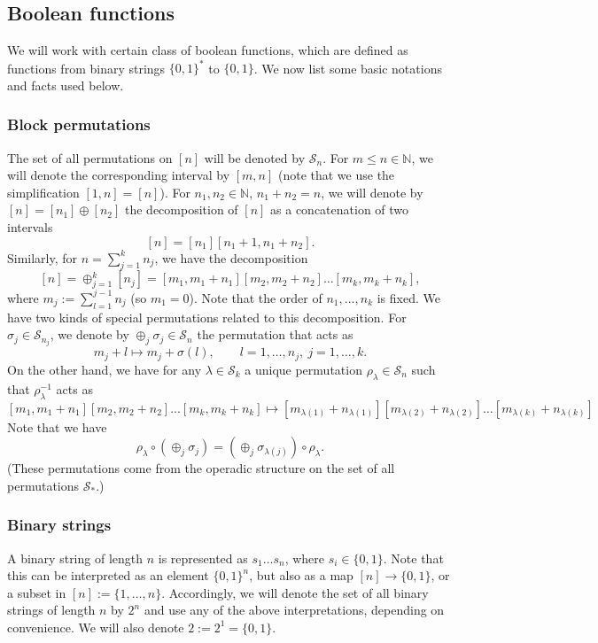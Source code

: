 \documentclass[12pt]{article}
\theoremstyle{definition}
\theoremstyle{remark}
\def\permut{\mathscr{S}}
\begin{document}
\subsection{Boolean functions}


We will work with certain class of boolean functions, which are defined as  functions from binary
strings $\{0,1\}^*$ to $\{0,1\}$. We now list some basic notations and facts used below.

\subsubsection{Block permutations}
\label{sec:permut}

The set of all permutations on $[n]$ will be denoted by $\permut_n$.
For $m\le n\in \mathbb N$, we will denote the corresponding interval by $[m,n]$ (note that
we use the simplification  $[1,n]=[n]$). For $n_1,n_2\in \mathbb N$, $n_1+n_2=n$, 
we will denote by $[n]=[n_1]\oplus [n_2]$ the decomposition of $[n]$ as a concatenation of two 
intervals
\[
[n]=[n_1][n_1+1,n_1+n_2].
\]
Similarly, for $n=\sum_{j=1}^kn_j$, we have the decomposition
\[
[n]=\oplus_{j=1}^k[n_j]=[m_1,m_1+n_1][m_2,m_2+n_2]\dots[m_k,m_k+n_k],
\]
where $m_j:=\sum_{l=1}^{j-1} n_j$ (so $m_1=0$). Note that the order of $n_1,\dots, n_k$ is
fixed. We have two kinds of special permutations related to this decomposition. For
$\sigma_j\in \permut_{n_j}$, we denote by $\oplus_j \sigma_j\in \permut_n$ the permutation that acts as
\[
m_j+l\mapsto m_j+\sigma(l),\qquad l=1,\dots,n_j,\ j=1,\dots, k. 
\]
On the other hand, we have for any $\lambda\in \permut_k$ a unique permutation
$\rho_\lambda\in\permut_n$  such that $\rho_\lambda^{-1}$ acts as
\[
[m_1,m_1+n_1][m_2,m_2+n_2]...[m_k,m_k+n_k]\mapsto
[m_{\lambda(1)}+n_{\lambda(1)}][m_{\lambda(2)}+n_{\lambda(2)}]\dots[m_{\lambda(k)}+n_{\lambda(k)}]
\]
Note that we have
\[
\rho_\lambda\circ(\oplus_j\sigma_j)=(\oplus_j \sigma_{\lambda(j)})\circ\rho_\lambda.
\]
(These permutations  come from the operadic structure on the set of
all permutations $\permut_*$.)


\subsubsection{Binary strings}

A binary string of length $n$ is represented as $s_1\dots s_n$, where $s_i\in
\{0,1\}$. Note that this can be interpreted as an element $\{0,1\}^n$, but also as a 
map $[n]\to \{0,1\}$, or a subset in  $[n]:=\{1,\dots,n\}$. 
Accordingly, we will denote the set of all binary strings of length $n$ by $2^n$ and use
any of the above interpretations, depending on convenience. We will also denote
$2:=2^1=\{0,1\}$. 
\end{document}
